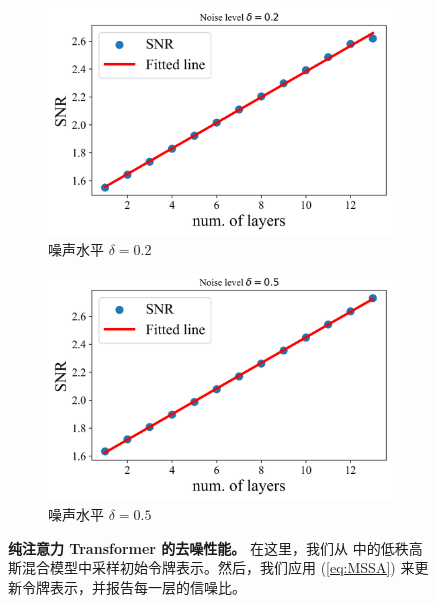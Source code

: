 \documentclass[../../book-main.tex]{subfiles}
\begin{document}
\begin{figure}[t]
    \begin{subfigure}[t]{0.45\textwidth}
        \centering
        \includegraphics[width=\textwidth]{figs_chap4/SNR1.png}
        \caption{噪声水平 $\delta = 0.2$}
    \end{subfigure}
    \hfill
    \begin{subfigure}[t]{0.45\textwidth}
        \centering
        \includegraphics[width=\textwidth]{figs_chap4/SNR2.png}
        \caption{噪声水平 $\delta = 0.5$}
    \end{subfigure}
    \caption{{\bf 纯注意力 Transformer 的去噪性能。} 在这里，我们从  中的低秩高斯混合模型中采样初始令牌表示。然后，我们应用 (\ref{eq:MSSA}) 来更新令牌表示，并报告每一层的信噪比。}  \label{fig:MSSA}
\end{figure}
\end{document}
